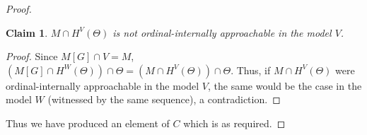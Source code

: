 \documentclass[a4paper]{amsart}
\theoremstyle{definition}
\newtheorem{mydef}{Definition}[section]
\theoremstyle{remark}
\theoremstyle{plain}
\newtheorem{mypro}[mydef]{Proposition}
\newtheorem{myclan}[mydef]{Claim}
\numberwithin{mydef}{section}
\DeclareMathOperator{\ICNIA}{\textup{\textsf{ICNIA}}}
\DeclareMathOperator{\Sk}{Sk}
\newcommand{\dM}{\mathbb{M}}
\newcommand{\seq}[2]{\langle #1 : #2 \rangle}
\begin{document}
\begin{proof}
		\begin{myclan}
			$M\cap H^V(\Theta)$ is not ordinal-internally approachable in the model $V$.
		\end{myclan}
		
		\begin{proof}
			Since $M[G]\cap V=M$, $(M[G]\cap H^W(\Theta))\cap\Theta=(M\cap H^V(\Theta))\cap\Theta$. Thus, if $M\cap H^V(\Theta)$ were ordinal-internally approachable in the model $V$, the same would be the case in the model $W$ (witnessed by the same sequence), a contradiction.
		\end{proof}
		Thus we have produced an element of $C$ which is as required.
	\end{proof}
	
%	
%	
%
%
%
%
%
%	
\end{document}
